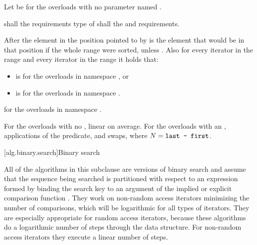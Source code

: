 \begin{itemdescr}
\begin{addedblock}
\pnum
Let  be  for the overloads with no parameter
named .
\end{addedblock}

\pnum
\requires
{}
 shall  the
 requirements type of  shall
 the
 and
 requirements.

\pnum
\effects
After
the element in the position pointed to by 
is the element that would be
in that position if the whole range were sorted, unless .
Also for every iterator
in the range
and every iterator
in the range
it holds that:
\begin{addedblock}
\begin{itemize}
\item {} is  for the overloads in namespace
  , or
\item {} is
   for the overloads in namespace .
\end{itemize}

\pnum
\returns {} for the overloads in namespace .
\end{addedblock}

\pnum
\complexity
For the overloads with no , linear on average.
For the overloads with an ,  applications of
the predicate, and  swaps, where $N = \texttt{last - first}$.
\end{itemdescr}


[alg.binary.search]{Binary search}

\pnum
All of the algorithms in this subclause are versions of binary search
and assume that the sequence being searched is partitioned with respect to
an expression formed by binding the search key to an argument of the
implied or explicit comparison function .
They work on non-random access iterators minimizing the number of comparisons,
which will be logarithmic for all types of iterators.
They are especially appropriate for random access iterators,
because these algorithms do a logarithmic number of steps
through the data structure.
For non-random access iterators they execute a linear number of steps.


